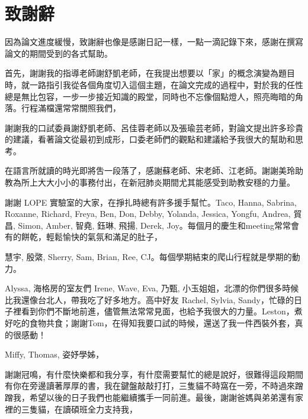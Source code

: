 

\chapter*{致謝辭}
因為論文進度緩慢，致謝辭也像是感謝日記一樣，一點一滴記錄下來，感謝在撰寫論文的期間受到的各式幫助。

首先，謝謝我的指導老師謝舒凱老師，在我提出想要以「家」的概念演變為題目時，就一路指引我從各個角度切入這個主題，在論文完成的過程中，對於我的任性總是無比包容，一步一步接近知識的殿堂，同時也不忘像個點燈人，照亮晦暗的角落。行程滿檔還常常關照我們，

謝謝我的口試委員謝舒凱老師、呂佳蓉老師以及張瑜芸老師，對論文提出許多珍貴的建議，看著論文從最初到成形，口委老師們的觀點和建議給予我很大的幫助和思考。

在語言所就讀的時光即將吿一段落了，感謝蘇老師、宋老師、江老師。謝謝美玲助教為所上大大小小的事務付出，在新冠肺炎期間尤其能感受到助教安穩的力量。

謝謝 LOPE 實驗室的大家，在掙扎時總有許多援手幫忙。Taco, Hanna, Sabrina, Roxanne, Richard, Freya, Ben, Don, Debby, Yolanda, Jessica, Yongfu, Andrea, 貿昌, Simon, Amber, 智堯, 鈺琳, 飛揚, Derek, Joy。每個月的慶生和meeting常常會有的餅乾，輕鬆愉快的氣氛和滿足的肚子，

慧宇, 殷綮, Sherry, Sam, Brian, Ree, CJ。每個學期結束的爬山行程就是學期的動力。

Alyssa, 海格房的室友們 Irene, Wave, Eva, 乃甄, 小玉姐姐，北漂的你們很多時候比我還像台北人，帶我吃了好多地方。高中好友 Rachel, Sylvia, Sandy，忙碌的日子裡看到你們不斷地前進，儘管無法常常見面，也給予我很大的力量。Leston，煮好吃的食物共食；謝謝Tom，在得知我要口試的時候，還送了我一件西裝外套，真的很感動！

Miffy, Thomas, 姿妤學姊，


謝謝冠鳴，有什麼快樂都和我分享，有什麼需要幫忙的總是說好，很難得這段期間有你在旁邊讀著厚厚的書，我在鍵盤敲敲打打，三隻貓不時窩在一旁，不時過來蹭蹭我，希望以後的日子我們也能繼續攜手一同前進。最後，謝謝爸媽與弟弟還有家裡的三隻貓，在讀碩班全力支持我，


